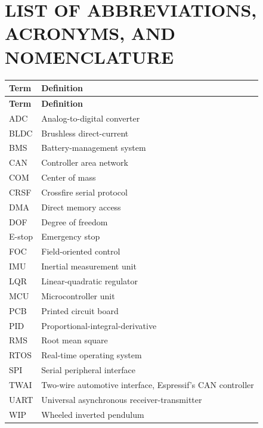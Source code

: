 \clearpage
\chapter*{LIST OF ABBREVIATIONS, ACRONYMS, AND NOMENCLATURE}
\begin{longtable}{@{}p{1.25in}p{5.0in}@{}}
\toprule
\textbf{Term} & \textbf{Definition} \\
\midrule
\endfirsthead
\toprule
\textbf{Term} & \textbf{Definition} \\
\midrule
\endhead
ADC & Analog-to-digital converter \\
BLDC & Brushless direct-current \\
BMS & Battery-management system \\
CAN & Controller area network \\
COM & Center of mass \\
CRSF & Crossfire serial protocol \\
DMA & Direct memory access \\
DOF & Degree of freedom \\
E-stop & Emergency stop \\
FOC & Field-oriented control \\
IMU & Inertial measurement unit \\
LQR & Linear-quadratic regulator \\
MCU & Microcontroller unit \\
PCB & Printed circuit board \\
PID & Proportional-integral-derivative \\
RMS & Root mean square \\
RTOS & Real-time operating system \\
SPI & Serial peripheral interface \\
TWAI & Two-wire automotive interface, Espressif's CAN controller \\
UART & Universal asynchronous receiver-transmitter \\
WIP & Wheeled inverted pendulum \\
\bottomrule
\end{longtable}
